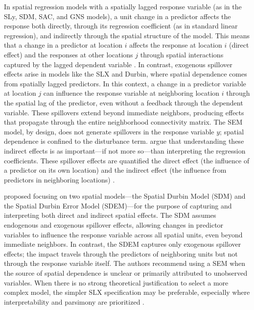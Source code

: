 \documentclass[lineno,pdflatex,sn-basic]{sn-jnl}%
\theoremstyle{thmstyleone}%
\theoremstyle{thmstyletwo}%
\theoremstyle{thmstylethree}%
\begin{document}
In spatial regression models with a spatially lagged response variable (as in the SLy, SDM, SAC, and GNS models), a unit change in a predictor affects the response both directly, through its regression coefficient (as in standard linear regression), and indirectly through the spatial structure of the model.  
This means that a change in a predictor at location $i$ affects the response at location $i$ (direct effect) and the responses at other locations $j$ through spatial interactions captured by the lagged dependent variable \citep{lesage2014spatial, bivand2022}. 
In contrast, exogenous spillover effects arise in models like the SLX and Durbin, where spatial dependence comes from spatially lagged predictors. 
In this context, a change in a predictor variable at location $j$ can influence the response variable at neighboring location $i$ through the spatial lag of the predictor, even without a feedback through the dependent variable.
These spillovers extend beyond immediate neighbors, producing effects that propagate through the entire neighborhood connectivity matrix. 
The SEM model, by design, does not generate spillovers in the response variable $y$; spatial dependence is confined to the disturbance term.
\cite{elhorst2013spatial} argue that understanding these indirect effects is as important—if not more so—than interpreting the regression coefficients.
These spillover effects are quantified the direct effect (the influence of a predictor on its own location) and the indirect effect (the influence from predictors in neighboring locations) \citep{elhorst2013spatial}.

\cite{lesage2014spatial} proposed focusing on two spatial models—the Spatial Durbin Model (SDM) and the Spatial Durbin Error Model (SDEM)—for the purpose of capturing and interpreting both direct and indirect spatial effects. 
The SDM assumes endogenous and exogenous spillover effects, allowing changes in predictor variables to influence the response variable across all spatial units, even beyond immediate neighbors. 
In contrast, the SDEM captures only exogenous spillover effects; the impact travels through the predictors of neighboring units but not through the response variable itself. 
The authors recommend using a SEM when the source of spatial dependence is unclear or primarily attributed to unobserved variables. 
When there is no strong theoretical justification to select a more complex model, the simpler SLX specification may be preferable, especially where interpretability and parsimony are prioritized \citep{halleck2017regional, halleck2015slx}.
\end{document}
